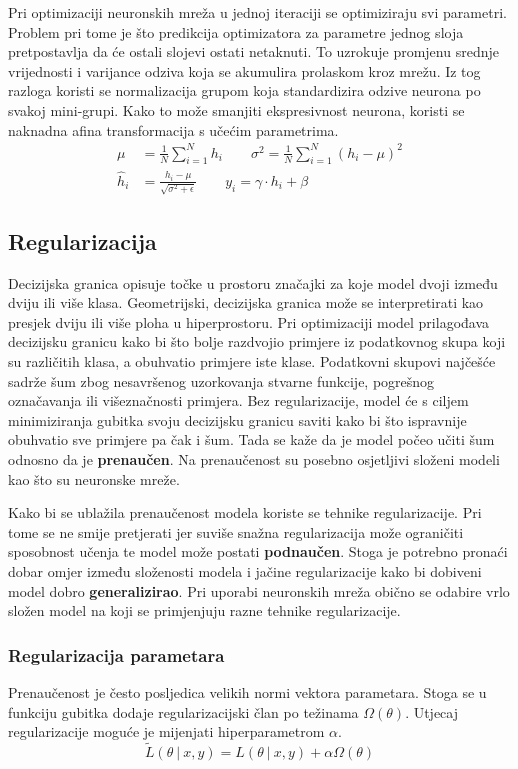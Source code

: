 \documentclass[times, utf8, numeric, diplomski]{fer}
\def\probsep{\ |\ }
\begin{document}
Pri optimizaciji neuronskih mreža u jednoj iteraciji se optimiziraju svi parametri. Problem pri tome je što predikcija optimizatora za parametre jednog sloja pretpostavlja da će ostali slojevi ostati netaknuti. To uzrokuje promjenu srednje vrijednosti i varijance odziva koja se akumulira prolaskom kroz mrežu. Iz tog razloga koristi se normalizacija grupom koja standardizira odzive neurona po svakoj mini-grupi. Kako to može smanjiti ekspresivnost neurona, koristi se naknadna afina transformacija s učećim parametrima.
\begin{align}
\mu &= \frac{1}{N} \sum_{i=1}^N h_i \qquad
\sigma^2 = \frac{1}{N} \sum_{i=1}^N (h_i-\mu)^2 \\
\hat{h}_i &= \frac{h_i - \mu}{\sqrt{\sigma^2 + \epsilon}} \qquad
y_i = \gamma \cdot h_i + \beta
\end{align}

\subsection{Regularizacija}
\label{sec:regularizacija}
Decizijska granica opisuje točke u prostoru značajki za koje model dvoji između dviju ili više klasa. Geometrijski, decizijska granica može se interpretirati kao presjek dviju ili više ploha u hiperprostoru. Pri optimizaciji model prilagođava decizijsku granicu kako bi što bolje razdvojio primjere iz podatkovnog skupa koji su različitih klasa, a obuhvatio primjere iste klase. Podatkovni skupovi najčešće sadrže šum zbog nesavršenog uzorkovanja stvarne funkcije, pogrešnog označavanja ili višeznačnosti primjera. Bez regularizacije, model će s ciljem minimiziranja gubitka svoju decizijsku granicu saviti kako bi što ispravnije obuhvatio sve primjere pa čak i šum. Tada se kaže da je model počeo učiti šum odnosno da je \textbf{prenaučen}. Na prenaučenost su posebno osjetljivi složeni modeli kao što su neuronske mreže.

Kako bi se ublažila prenaučenost modela koriste se tehnike regularizacije. Pri tome se ne smije pretjerati jer suviše snažna regularizacija može ograničiti sposobnost učenja te model može postati \textbf{podnaučen}. Stoga je potrebno pronaći dobar omjer između složenosti modela i jačine regularizacije kako bi dobiveni model dobro \textbf{generalizirao}. Pri uporabi neuronskih mreža obično se odabire vrlo složen model na koji se primjenjuju razne tehnike regularizacije.

\subsubsection{Regularizacija parametara}
Prenaučenost je često posljedica velikih normi vektora parametara. Stoga se u funkciju gubitka dodaje regularizacijski član po težinama $\Omega(\theta)$. Utjecaj regularizacije moguće je mijenjati hiperparametrom $\alpha$.
\begin{equation}
\label{eq:weights_regularization}
\tilde{L}(\theta \probsep x,y) = L(\theta \probsep x,y) + \alpha\Omega(\theta)
\end{equation}
\end{document}
